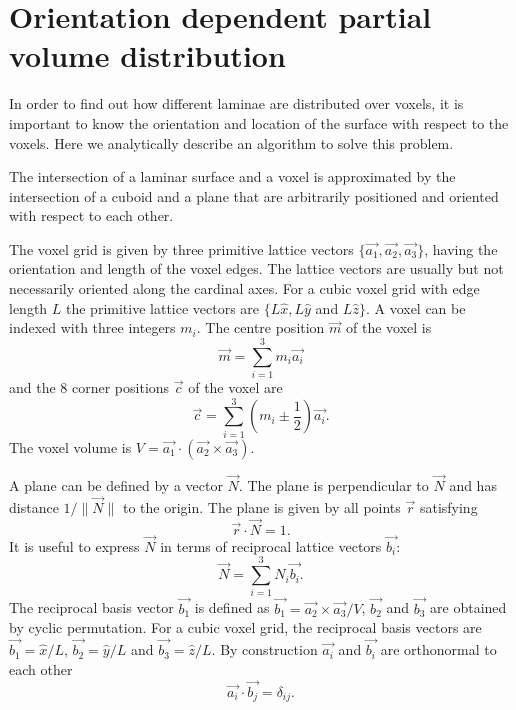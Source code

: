 \section{Orientation dependent partial volume distribution}
\label{sec:Appendix2}
In order to find out how different laminae are distributed over voxels, it is important to know the orientation and location of the surface with respect to the voxels. Here we analytically describe an algorithm to solve this problem.

The intersection of a laminar surface and a voxel is approximated by the intersection of a cuboid and a plane that are arbitrarily positioned and oriented with respect to each other.

The voxel grid is given by three primitive lattice vectors $\{\vec{a_1}, \vec{a_2}, \vec{a_3}\}$, having the orientation and length of the voxel edges. The lattice vectors are usually but not necessarily oriented along the cardinal axes. For a cubic voxel grid with edge length $L$ the primitive lattice vectors are $\{L \hat{x}, L \hat{y}$ and $L \hat{z}\}$.
A voxel can be indexed with three integers $m_i$. The centre position $\vec{m}$ of the voxel is 
\begin{equation}
 \vec{m}=\sum_{i=1}^{3}m_i \vec{a_i}
\end{equation}
and the 8 corner positions $\vec{c}$ of the voxel are
 \begin{equation}
 \vec{c}=\sum_{i=1}^{3}\left(m_i \pm \frac{1}{2} \right) \vec{a_i}.
\end{equation}
The voxel volume is $V=\vec{a_1}\cdot \left( \vec{a_2} \times \vec{a_3}\right)$.

A plane can be defined by a vector $\vec{N}$. The plane is perpendicular to $\vec{N}$ and has distance $1/\|\vec{N}\|$ to the origin. The plane is given by all points $\vec{r}$ satisfying
\begin{equation}
 \vec{r} \cdot \vec{N}=1.
\end{equation}
It is useful to express $\vec{N}$ in terms of reciprocal lattice vectors $\vec{b_i}$:
\begin{equation}
 \vec{N}=\sum_{i=1}^{3}N_i\vec{b_i}.
\label{eq:rn=1}
\end{equation}
The reciprocal basis vector $\vec{b_1}$ is defined as $\vec{b_1}=\vec{a_2} \times \vec{a_3} / V$, $\vec{b_2}$ and $\vec{b_3}$ are obtained by cyclic permutation. For a cubic voxel grid, the  reciprocal basis vectors are $\vec{b_1}=\hat{x}/L$, $\vec{b_2}=\hat{y}/L$ and $\vec{b_3}=\hat{z}/L$. By construction $\vec{a_i}$ and $\vec{b_i}$ are orthonormal to each other
\begin{equation}
\vec{a_i} \cdot \vec{b_j} = \delta_{ij}.
\end{equation}

